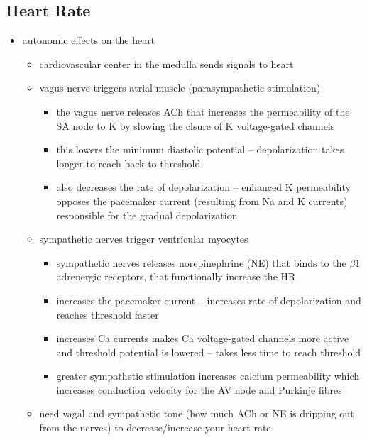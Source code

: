\documentclass[10pt]{article}
\begin{document}
\subsection{Heart Rate}
\begin{itemize}
    \item autonomic effects on the heart
        \begin{itemize}
            \item cardiovascular center in the medulla sends signals to heart
            \item vagus nerve triggers atrial muscle (parasympathetic stimulation)
                \begin{itemize}
                    \item the vagus nerve releases ACh that increases the permeability of the SA node to K by slowing the clsure of K voltage-gated channels
                    \item this lowers the minimum diastolic potential -- depolarization takes longer to reach back to threshold
                    \item also decreases the rate of depolarization -- enhanced K permeability opposes the pacemaker current (resulting from Na and K currents) responsible for the gradual depolarization
                \end{itemize}
            \item sympathetic nerves trigger ventricular myocytes
                \begin{itemize}
                    \item sympathetic nerves releases norepinephrine (NE) that binds to the $\beta 1$ adrenergic receptors, that functionally increase the HR
                    \item increases the pacemaker current -- increases rate of depolarization and reaches threshold faster
                    \item increases Ca currents makes Ca voltage-gated channels more active and threshold potential is lowered -- takes less time to reach threshold
                    \item greater sympathetic stimulation increases calcium permeability which increases conduction velocity for the AV node and Purkinje fibres
                \end{itemize}
            \item need vagal and sympathetic tone (how much ACh or NE is dripping out from the nerves) to decrease/increase your heart rate
        \end{itemize}
\end{itemize}
\end{document}
